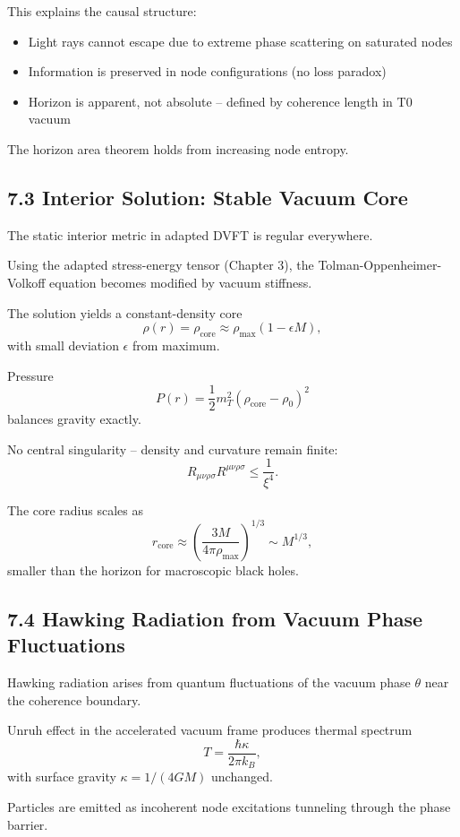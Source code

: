 	This explains the causal structure:
	\begin{itemize}
		\item Light rays cannot escape due to extreme phase scattering on saturated nodes
		\item Information is preserved in node configurations (no loss paradox)
		\item Horizon is apparent, not absolute – defined by coherence length in T0 vacuum
	\end{itemize}
	
	The horizon area theorem holds from increasing node entropy.
	
	\subsection{7.3 Interior Solution: Stable Vacuum Core}
	
	The static interior metric in adapted DVFT is regular everywhere.
	
	Using the adapted stress-energy tensor (Chapter 3), the Tolman-Oppenheimer-Volkoff equation becomes modified by vacuum stiffness.
	
	The solution yields a constant-density core
	\[
	\rho(r) = \rho_{\text{core}} \approx \rho_{\text{max}} (1 - \epsilon M),
	\]
	with small deviation $\epsilon$ from maximum.
	
	Pressure
	\[
	P(r) = \frac{1}{2} m_T^2 (\rho_{\text{core}} - \rho_0)^2
	\]
	balances gravity exactly.
	
	No central singularity – density and curvature remain finite:
	\[
	R_{\mu\nu\rho\sigma} R^{\mu\nu\rho\sigma} \leq \frac{1}{\xi^4}.
	\]
	
	The core radius scales as
	\[
	r_{\text{core}} \approx \left(\frac{3M}{4\pi \rho_{\text{max}}}\right)^{1/3} \sim M^{1/3},
	\]
	smaller than the horizon for macroscopic black holes.
	
	\subsection{7.4 Hawking Radiation from Vacuum Phase Fluctuations}
	
	Hawking radiation arises from quantum fluctuations of the vacuum phase $\theta$ near the coherence boundary.
	
	Unruh effect in the accelerated vacuum frame produces thermal spectrum
	\[
	T = \frac{\hbar \kappa}{2\pi k_B},
	\]
	with surface gravity $\kappa = 1/(4GM)$ unchanged.
	
	Particles are emitted as incoherent node excitations tunneling through the phase barrier.
	

